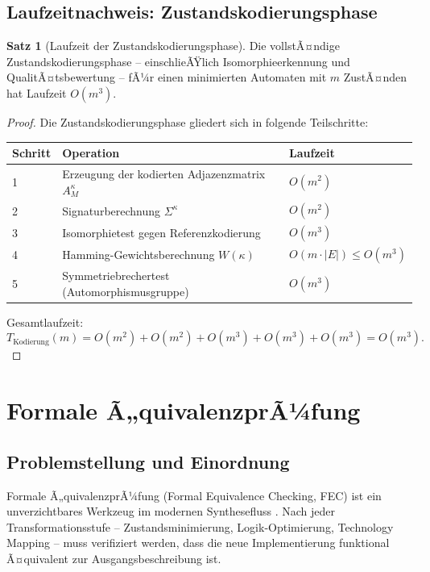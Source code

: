 ﻿\documentclass[a4paper,12pt]{article}
\theoremstyle{definition}
\newtheorem{satz}{Satz}
\begin{document}
\subsection{Laufzeitnachweis: Zustandskodierungsphase}

\begin{satz}[Laufzeit der Zustandskodierungsphase]\label{satz:kodzlaufzeit}
  Die vollstÃ¤ndige Zustandskodierungsphase -- einschlieÃŸlich Isomorphieerkennung und
  QualitÃ¤tsbewertung -- fÃ¼r einen minimierten Automaten mit $m$ ZustÃ¤nden hat Laufzeit
  $O(m^3)$.
\end{satz}

\begin{proof}
  Die Zustandskodierungsphase gliedert sich in folgende Teilschritte:

  \begin{center}
  \begin{tabular}{lll}
    \toprule
    Schritt & Operation & Laufzeit \\
    \midrule
    1 & Erzeugung der kodierten Adjazenzmatrix $A_M^\kappa$ & $O(m^2)$ \\
    2 & Signaturberechnung $\Sigma^\kappa$ & $O(m^2)$ \\
    3 & Isomorphietest gegen Referenzkodierung  & $O(m^3)$ \\
    4 & Hamming-Gewichtsberechnung $W(\kappa)$ & $O(m \cdot |E|) \leq O(m^3)$ \\
    5 & Symmetriebrechertest (Automorphismusgruppe) & $O(m^3)$ \\
    \bottomrule
  \end{tabular}
  \end{center}

  Gesamtlaufzeit:
  \[
    T_{\text{Kodierung}}(m) = O(m^2) + O(m^2) + O(m^3) + O(m^3) + O(m^3) = O(m^3).
  \]
\end{proof}

\section{Formale Ã„quivalenzprÃ¼fung}

\subsection{Problemstellung und Einordnung}

Formale Ã„quivalenzprÃ¼fung (Formal Equivalence Checking, FEC) ist ein unverzichtbares
Werkzeug im modernen Synthesefluss \cite[Kap.~7]{ciletti2011}. Nach jeder
Transformationsstufe -- Zustandsminimierung, Logik-Optimierung, Technology Mapping --
muss verifiziert werden, dass die neue Implementierung funktional Ã¤quivalent zur
Ausgangsbeschreibung ist.
\end{document}
